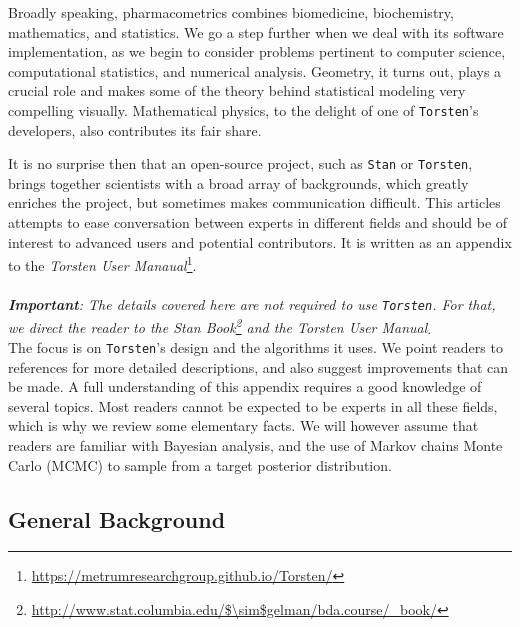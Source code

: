 \documentclass[11pt]{article}
\begin{document}
  Broadly speaking, pharmacometrics
  combines biomedicine, biochemistry, mathematics, and statistics. We
  go a step further when we deal with its software implementation,
  as we begin to consider problems pertinent
  to computer science, computational statistics, and numerical analysis. 
  Geometry, it turns out, plays a crucial role and makes some of the theory
  behind statistical modeling very compelling visually. Mathematical
  physics, to the delight of one of \texttt{Torsten}'s developers, also contributes
  its fair share.
  
  It is no surprise then that an open-source project, such as \texttt{Stan} or \texttt{Torsten}, 
  brings together scientists with a broad array of backgrounds, which greatly 
  enriches the project, but sometimes makes communication difficult. This 
  articles attempts to ease conversation between experts in different fields 
  and should be of interest to advanced users and potential contributors. 
  It is written as an appendix to the \textit{Torsten User 
  Manaual}\footnote{\url{https://metrumresearchgroup.github.io/Torsten/}}. \\ \\
  \textit{\textbf{Important}: The details covered here are not required to use \texttt{Torsten}.
  For that, we direct the reader to the \textit{Stan Book}\footnote{\url{http://www.stat.columbia.edu/$\sim$gelman/bda.course/\_book/}}
  and the \textit{Torsten User Manual}}. \\
  
  The focus is on \texttt{Torsten}'s design and the algorithms it uses. We point readers
  to references for more detailed descriptions, and also suggest improvements
  that can be made.
  A full understanding of this appendix requires a good knowledge of several topics.
  Most readers cannot be expected to be experts in all these fields, which is
  why we review some elementary facts. We will however assume that readers are familiar
  with Bayesian analysis, and the use of Markov chains Monte Carlo (MCMC) to sample from
  a target posterior distribution.
  
  \subsection{General Background}
  
\end{document}

